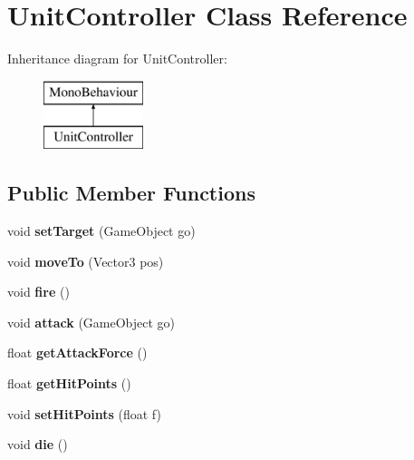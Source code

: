 \hypertarget{class_unit_controller}{}\section{Unit\+Controller Class Reference}
\label{class_unit_controller}
Inheritance diagram for Unit\+Controller\+:\begin{figure}[H]
\begin{center}
\leavevmode
\includegraphics[height=2.000000cm]{class_unit_controller}
\end{center}
\end{figure}
\subsection*{Public Member Functions}
\begin{DoxyCompactItemize}
\item 
\hypertarget{class_unit_controller_a94132ec1f2ffd7bf1e224ea24fecf9e6}{}void {\bfseries set\+Target} (Game\+Object go)\label{class_unit_controller_a94132ec1f2ffd7bf1e224ea24fecf9e6}

\item 
\hypertarget{class_unit_controller_ab6381f8b8da8f0509f23bda9871a5e90}{}void {\bfseries move\+To} (Vector3 pos)\label{class_unit_controller_ab6381f8b8da8f0509f23bda9871a5e90}

\item 
\hypertarget{class_unit_controller_a4b7718e2d007cc652601dec1654136c2}{}void {\bfseries fire} ()\label{class_unit_controller_a4b7718e2d007cc652601dec1654136c2}

\item 
\hypertarget{class_unit_controller_a1a29d3f3d0bd4166f0094103f6c5a7e7}{}void {\bfseries attack} (Game\+Object go)\label{class_unit_controller_a1a29d3f3d0bd4166f0094103f6c5a7e7}

\item 
\hypertarget{class_unit_controller_a650b7ed580602a0e2d18b3e64cc7daa1}{}float {\bfseries get\+Attack\+Force} ()\label{class_unit_controller_a650b7ed580602a0e2d18b3e64cc7daa1}

\item 
\hypertarget{class_unit_controller_ae81b8f04d34b104eb9d73f353cf275de}{}float {\bfseries get\+Hit\+Points} ()\label{class_unit_controller_ae81b8f04d34b104eb9d73f353cf275de}

\item 
\hypertarget{class_unit_controller_a9b8260bff2cb66c92aacb71b5e96529f}{}void {\bfseries set\+Hit\+Points} (float f)\label{class_unit_controller_a9b8260bff2cb66c92aacb71b5e96529f}

\item 
\hypertarget{class_unit_controller_abd5e7ad90a255e0f0103ddc312df4bb9}{}void {\bfseries die} ()\label{class_unit_controller_abd5e7ad90a255e0f0103ddc312df4bb9}

\end{DoxyCompactItemize}
